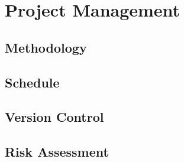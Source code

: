 \chapter{Project Management}
\label{chapter4}

\section{Methodology}
\lipsum[1-1] \cite{parikh1980adaptive}

\section{Schedule}
\lipsum[1-1] \cite{parikh1980adaptive}

\section{Version Control}
\lipsum[1-1] \cite{parikh1980adaptive}

\section{Risk Assessment}
\lipsum[1-1] \cite{parikh1980adaptive}